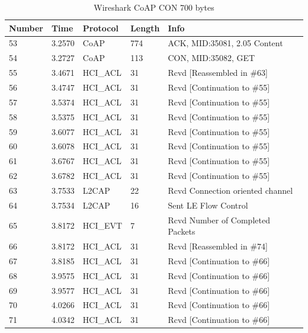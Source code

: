 \newpage

\begin{table}[H]
\small
\centering
\caption{Wireshark CoAP CON 700 bytes}
\label{coapCON700table}
\begin{tabular}{lllll}
\hline
Number & Time    & Protocol & Length & Info                             \\ \hline
53     & 3.2570  & CoAP     & 774    & ACK, MID:35081, 2.05 Content     \\
54     & 3.2727  & CoAP     & 113    & CON, MID:35082, GET	              \\
55     & 3.4671  & HCI\_ACL & 31     & Rcvd {[}Reassembled in \#63{]}   \\
56     & 3.4747  & HCI\_ACL & 31     & Rcvd {[}Continuation to \#55{]}  \\
57     & 3.5374  & HCI\_ACL & 31     & Rcvd {[}Continuation to \#55{]}  \\
58     & 3.5375  & HCI\_ACL & 31     & Rcvd {[}Continuation to \#55{]}  \\
59     & 3.6077  & HCI\_ACL & 31     & Rcvd {[}Continuation to \#55{]}  \\
60     & 3.6078  & HCI\_ACL & 31     & Rcvd {[}Continuation to \#55{]}  \\
61     & 3.6767  & HCI\_ACL & 31     & Rcvd {[}Continuation to \#55{]}  \\
62     & 3.6782  & HCI\_ACL & 31     & Rcvd {[}Continuation to \#55{]}  \\
63     & 3.7533  & L2CAP    & 22     & Rcvd Connection oriented channel \\
64     & 3.7534  & L2CAP    & 16     & Sent LE Flow Control             \\
65     & 3.8172  & HCI\_EVT & 7      & Rcvd Number of Completed Packets \\
66     & 3.8172  & HCI\_ACL & 31     & Rcvd {[}Reassembled in \#74{]}   \\
67     & 3.8185  & HCI\_ACL & 31     & Rcvd {[}Continuation to \#66{]}  \\
68     & 3.9575  & HCI\_ACL & 31     & Rcvd {[}Continuation to \#66{]}  \\
69     & 3.9577  & HCI\_ACL & 31     & Rcvd {[}Continuation to \#66{]}  \\
70     & 4.0266  & HCI\_ACL & 31     & Rcvd {[}Continuation to \#66{]}  \\
71     & 4.0342  & HCI\_ACL & 31     & Rcvd {[}Continuation to \#66{]}  \\

\end{tabular}
\end{table}
